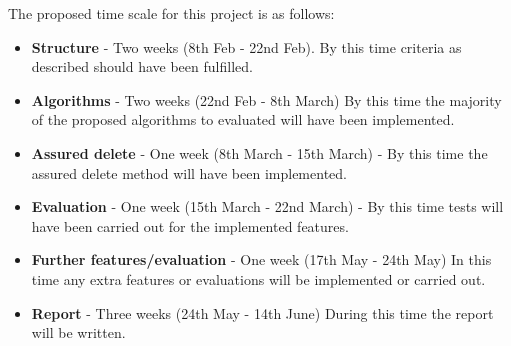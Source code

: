 \documentclass[10pt, titlepage]{article}
\begin{document}
The proposed time scale for this project is as follows:
\begin{itemize}
\item \textbf{Structure} - Two weeks (8th Feb - 22nd Feb). By this time criteria as described should have been fulfilled.
\item \textbf{Algorithms} - Two weeks (22nd Feb - 8th March) By this time the majority of the proposed algorithms to evaluated will have been implemented.
\item \textbf{Assured delete} - One week (8th March - 15th March) - By this time the assured delete method will have been implemented.
\item \textbf{Evaluation} - One week (15th March - 22nd March) - By this time tests will have been carried out for the implemented features.
\item \textbf{Further features/evaluation} - One week (17th May - 24th May) In this time any extra features or evaluations will be implemented or carried out.
\item \textbf{Report} - Three weeks (24th May - 14th June) During this time the report will be written.
\end{itemize}
\end{document}
